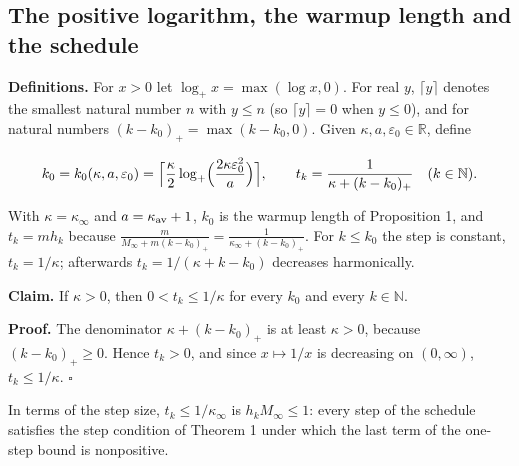 \documentclass[11pt,a4paper]{report}
\begin{document}
\subsection{\texorpdfstring{The positive logarithm, the warmup length and the schedule}{The positive logarithm, the warmup length and the schedule}}
\label{report-step-AverageLMC-Complexity-lean-1}


\textbf{Definitions.} For \(x>0\) let \(\log_+x=\max(\log x,0)\). For real \(y\), \(\lceil y\rceil\) denotes the smallest natural number \(n\) with \(y\le n\) (so \(\lceil y\rceil=0\) when \(y\le0\)), and for natural numbers \((k-k_0)_+=\max(k-k_0,0)\). Given \(\kappa,a,\varepsilon_0\in\mathbb R\), define


\[k_0=k_0(\kappa,a,\varepsilon_0)=\Bigl\lceil\frac\kappa2\log_+\Bigl(\frac{2\kappa\varepsilon_0^2}{a}\Bigr)\Bigr\rceil,\qquad t_k=\frac1{\kappa+(k-k_0)_+}\quad(k\in\mathbb N).\]


With \(\kappa=\kappa_\infty\) and \(a=\kappa_{\rm av}+1\), \(k_0\) is the warmup length of Proposition 1, and \(t_k=mh_k\) because \(\frac m{M_\infty+m(k-k_0)_+}=\frac1{\kappa_\infty+(k-k_0)_+}\). For \(k\le k_0\) the step is constant, \(t_k=1/\kappa\); afterwards \(t_k=1/(\kappa+k-k_0)\) decreases harmonically.




\textbf{Claim.} If \(\kappa>0\), then \(0<t_k\le1/\kappa\) for every \(k_0\) and every \(k\in\mathbb N\).




\textbf{Proof.} The denominator \(\kappa+(k-k_0)_+\) is at least \(\kappa>0\), because \((k-k_0)_+\ge0\). Hence \(t_k>0\), and since \(x\mapsto1/x\) is decreasing on \((0,\infty)\), \(t_k\le1/\kappa\). \(\square\)




In terms of the step size, \(t_k\le1/\kappa_\infty\) is \(h_kM_\infty\le1\): every step of the schedule satisfies the step condition of Theorem 1 under which the last term of the one-step bound is nonpositive.
\end{document}
